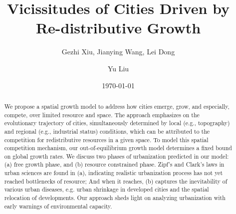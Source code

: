 \documentclass[reprint,unsortedaddress,amsmath,amssymb,aps,prl,showkeys]{revtex4-2}
\begin{document}
\title{Vicissitudes of Cities Driven by Re-distributive Growth}
\author{Gezhi Xiu, Jianying Wang, Lei Dong}
\author{Yu Liu}
\date{\today}

\begin{abstract}
    We propose a spatial growth model to address how cities emerge, grow, and especially, compete, over limited resource and space. The approach emphasizes on the evolutionary trajectory of cities, simultaneously determined by local (e.g., topography) and regional (e.g., industrial status) conditions, which can be attributed to the competition for redistributive resources in a given space. To model this spatial competition mechanism, our out-of-equilibrium growth model determines a fixed bound on global growth rates. We discuss two phases of urbanization predicted in our model: (a) free growth phase, and (b) resource constrained phase. Zipf's and Clark's laws in urban sciences are found in (a), indicating realistic urbanization process has not yet reached bottlenecks of resource; And when it reaches, (b) captures the inevitability of various urban diseases, e.g. urban shrinkage in developed cities and the spatial relocation of developments. Our approach sheds light on analyzing urbanization with early warnings of environmental capacity.
\end{abstract}
\maketitle
\end{document}
